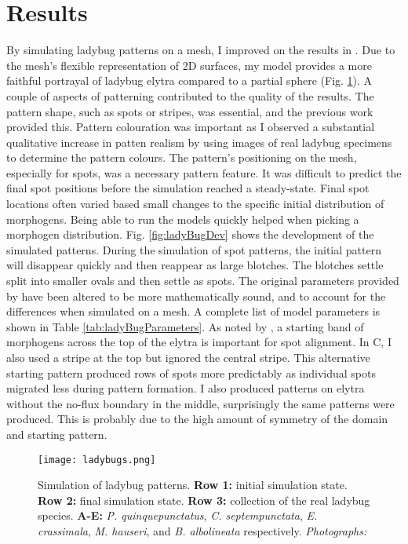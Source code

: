 \section{Results}
By simulating ladybug patterns on a mesh, I improved on the results in \citep{liaw2001}. Due to the mesh's flexible representation of 2D surfaces, my model provides a more faithful portrayal of ladybug elytra compared to a partial sphere (Fig. \ref{fig:ladyBugPatterns}). A couple of aspects of patterning contributed to the quality of the results. The pattern shape, such as spots or stripes, was essential, and the previous work provided this. Pattern colouration was important as I observed a substantial qualitative increase in patten realism by using images of real ladybug specimens to determine the pattern colours. The pattern's positioning on the mesh, especially for spots, was a necessary pattern feature. It was difficult to predict the final spot positions before the simulation reached a steady-state. Final spot locations often varied based small changes to the specific initial distribution of morphogens. Being able to run the models quickly helped when picking a morphogen distribution. Fig. \ref{fig:ladyBugDev} shows the development of the simulated patterns. During the simulation of spot patterns, the initial pattern will disappear quickly and then reappear as large blotches. The blotches settle split into smaller ovals and then settle as spots. The original parameters provided by \citet{liaw2001} have been altered to be more mathematically sound, and to account for the differences when simulated on a mesh. A complete list of model parameters is shown in Table \ref{tab:ladyBugParameters}. As noted by \citet{liaw2001}, a starting band of morphogens across the top of the elytra is important for spot alignment. In C, I also used a stripe at the top but ignored the central stripe. This alternative starting pattern produced rows of spots more predictably as individual spots migrated less during pattern formation. I also produced patterns on elytra without the no-flux boundary in the middle, surprisingly the same patterns were produced. This is probably due to the high amount of symmetry of the domain and starting pattern.

\begin{figure}[ht]
	\centering
	\texttt{[image: ladybugs.png]}
	\caption{Simulation of ladybug patterns. \textbf{Row 1:} initial simulation state. \textbf{Row 2:} final simulation state. \textbf{Row 3:} collection of the real ladybug species. \textbf{A-E:} \textit{P. quinquepunctatus}, \textit{C. septempunctata}, \textit{E. crassimala}, \textit{M. hauseri}, and \textit{B. albolineata} respectively. 
	 \textit{Photographs: \citep{chen2008}}}
	\label{fig:ladyBugPatterns}
\end{figure}

